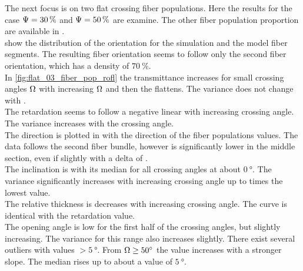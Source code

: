 % 
The next focus is on two flat crossing fiber populations.
Here the results for the case $\textnormal{$\Psi$} = \SI{30}{\percent}$ and $\textnormal{$\Psi$} = \SI{50}{\percent}$ are examine.
The other fiber population proportion are available in \dummy{}. %
\\
% 
 show the distribution of the orientation for the simulation and the model fiber segments.
The resulting fiber orientation seems to follow only the second fiber orientation, which has a density of $\SI{70}{\percent}$.
\\
In \cref{fig:flat_03_fiber_pop_rofl} the transmittance increases for small crossing angles $\textnormal{$\Omega$}$ with increasing $\textnormal{$\Omega$}$ and then the \dummy{} flattens.
The variance does not change with \dummy[value]{}.
\\
The retardation seems to follow a negative linear \dummy{} with increasing crossing angle.
The variance increases with the crossing angle.
\\
The direction is plotted in \dummy{} with the direction of the fiber populations values.
The data follows the second fiber bundle, however is significantly lower in the middle section, even if slightly with a delta of \dummy[value]{}.
\\
The inclination is with its median for all crossing angles at about $\SI{0}{\degree}$.
The variance significantly increases with increasing crossing angle up to \dummy[3]{} times the lowest value.
\\
The relative thickness is decreases with increasing crossing angle.
The curve is identical with the retardation value.
\\
The opening angle is low for the first half of the crossing angles, but slightly increasing.
The variance for this range also increases slightly.
There exist several outliers with values $> \SI{5}{\degree}$.
From $\textnormal{$\Omega$} \ge \SI{50}{\degree}$ the value increases with a stronger slope.
The median rises up to about a value of $\SI{5}{\degree}$.
% 
% 
